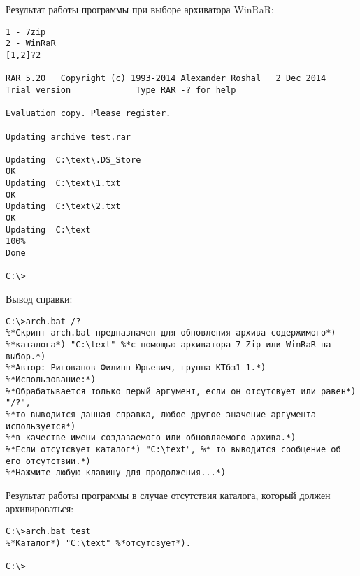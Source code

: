 \documentclass{article}
\begin{document}
\newpage
Результат работы программы при выборе архиватора WinRaR:
\begin{lstlisting}[language={},numbers={}]
%*Выберите архиватор:*)
1 - 7zip
2 - WinRaR
[1,2]?2

RAR 5.20   Copyright (c) 1993-2014 Alexander Roshal   2 Dec 2014
Trial version             Type RAR -? for help

Evaluation copy. Please register.

Updating archive test.rar

Updating  C:\text\.DS_Store                                           OK
Updating  C:\text\1.txt                                               OK
Updating  C:\text\2.txt                                               OK
Updating  C:\text                                                    100%
Done

C:\>
\end{lstlisting}
Вывод справки:
\begin{lstlisting}[language={},numbers={}]
C:\>arch.bat /?
%*Скрипт arch.bat предназначен для обновления архива содержимого*)
%*каталога*) "C:\text" %*с помощью архиватора 7-Zip или WinRaR на выбор.*)
%*Автор: Ригованов Филипп Юрьевич, группа КТбз1-1.*)
%*Использование:*)
%*Обрабатывается только перый аргумент, если он отсутсвует или равен*) "/?",
%*то выводится данная справка, любое другое значение аргумента используется*)
%*в качестве имени создаваемого или обновляемого архива.*)
%*Если отсутсвует каталог*) "C:\text", %* то выводится сообщение об его отсутствии.*)
%*Нажмите любую клавишу для продолжения...*)
\end{lstlisting}
Результат работы программы в случае отсутствия каталога, который должен архивироваться:
\begin{lstlisting}[language={},numbers={}]
C:\>arch.bat test
%*Каталог*) "C:\text" %*отсутсвует*).

C:\>
\end{lstlisting}
\end{document}
